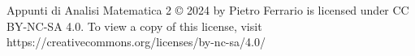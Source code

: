 Appunti di Analisi Matematica 2 © 2024 by Pietro Ferrario is licensed under CC BY-NC-SA 4.0. To view a copy of this license, visit https://creativecommons.org/licenses/by-nc-sa/4.0/